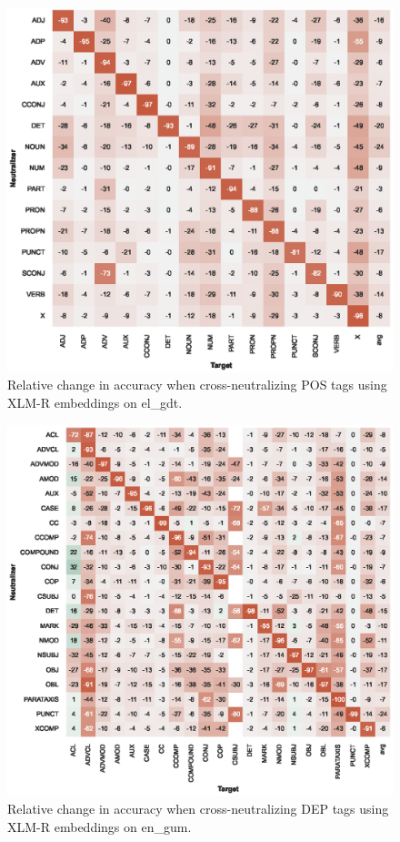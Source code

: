 \documentclass[11pt,a4paper]{article}
\begin{document}
\begin{figure}[t]
    \centering
    \includegraphics{full_figures/POS_xlm-roberta-base_el_gdt_acc_drop_agg=mean_probe=12.eps}
    \caption{Relative change in accuracy when cross-neutralizing POS tags using XLM-R embeddings on el\_gdt.}
    \label{fig:xneutr_xlm_pos_gr_complete}
\end{figure}

\begin{figure}[t]
    \centering
    \includegraphics{full_figures/DEP_roberta-base_en_gum_acc_drop_agg=mean_probe=3_concat-mode=ONLY.eps}
    \caption{Relative change in accuracy when cross-neutralizing DEP tags using XLM-R embeddings on en\_gum.}
    \label{fig:xneutr_xlm_dep_en_complete}
\end{figure}
\end{document}

